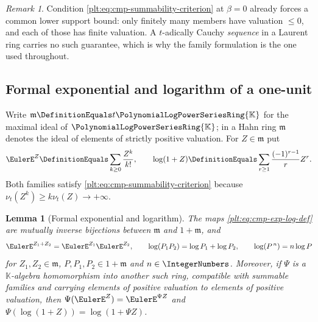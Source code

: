 \documentclass[11pt,oneside]{article}
\theoremstyle{plain}
\newtheorem{lemma}[theorem]{Lemma}
\theoremstyle{definition}
\theoremstyle{remark}
\newtheorem{remark}[theorem]{Remark}
\newcommand{\K}{\mathbb{K}}
\newcommand{\PLpow}{\PolynomialLogPowerSeriesRing{\K}}   %
\newcommand{\ordt}{\nu_{t}}                              %
\begin{document}
\begin{remark}\label{plt:rmk:cmp-lower-bound-automatic}
Condition \eqref{plt:eq:cmp-summability-criterion} at \(\beta=0\) already
forces a common lower support bound: only finitely many members have
valuation \(\le0\), and each of those has finite valuation.  A \(t\)-adically Cauchy
\emph{sequence} in a Laurent ring carries no such guarantee, which is why the
family formulation is the one used throughout.
\end{remark}

\subsection{Formal exponential and logarithm of a one-unit}
\label{plt:sec:cmp-exp-log}

Write \(\mathfrak m\DefinitionEquals t\PLpow\) for the maximal ideal of
\(\PLpow\); in a Hahn ring \(\mathfrak m\) denotes the ideal of elements of
strictly positive valuation.  For \(Z\in\mathfrak m\) put
\begin{equation}\label{plt:eq:cmp-exp-log-def}
 \EulerE^{Z}\DefinitionEquals\sum_{k\ge0}\frac{Z^k}{k!},
 \qquad
 \log(1+Z)\DefinitionEquals\sum_{r\ge1}\frac{(-1)^{r-1}}{r}Z^r .
\end{equation}
Both families satisfy \eqref{plt:eq:cmp-summability-criterion} because
\(\ordt(Z^k)\ge k\ordt(Z)\to+\infty\).

\begin{lemma}[Formal exponential and logarithm]\label{plt:lem:cmp-exp-log}
The maps \eqref{plt:eq:cmp-exp-log-def} are mutually inverse bijections
between \(\mathfrak m\) and \(1+\mathfrak m\), and
\[
 \EulerE^{Z_1+Z_2}=\EulerE^{Z_1}\EulerE^{Z_2},
 \qquad
 \log(P_1P_2)=\log P_1+\log P_2,
 \qquad
 \log(P^{\,n})=n\log P
\]
for \(Z_1,Z_2\in\mathfrak m\), \(P,P_1,P_2\in1+\mathfrak m\) and
\(n\in\IntegerNumbers\).  Moreover, if \(\Psi\) is a \(\K\)-algebra
homomorphism into another such ring, compatible with summable families and
carrying elements of positive valuation to elements of positive valuation,
then
\(\Psi(\EulerE^{Z})=\EulerE^{\Psi Z}\) and
\(\Psi(\log(1+Z))=\log(1+\Psi Z)\).
\end{lemma}
\end{document}
